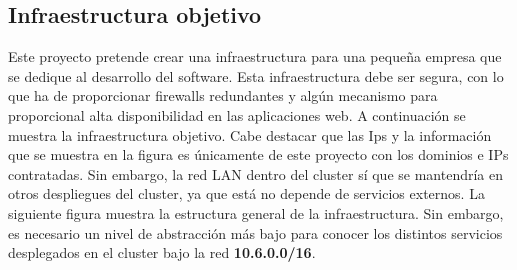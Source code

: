 \subsection{Infraestructura objetivo}
\begin{text}
	Este proyecto pretende crear una infraestructura para una pequeña empresa que se dedique al desarrollo del software. Esta infraestructura debe ser segura, con lo que ha de proporcionar firewalls redundantes y algún mecanismo para proporcional alta disponibilidad en las aplicaciones web.  A continuación se muestra la infraestructura objetivo. Cabe destacar que las Ips y la información que se muestra en la figura es únicamente de este proyecto con los dominios e IPs contratadas. Sin embargo, la red LAN dentro del cluster sí que se mantendría en otros despliegues del cluster, ya que está no depende de servicios externos. La siguiente figura muestra la estructura general de la infraestructura. Sin embargo, es necesario un nivel de abstracción más bajo para conocer los distintos servicios desplegados en el cluster bajo la red \textbf{10.6.0.0/16}.
	
	\clearpage
	

\end{text}
